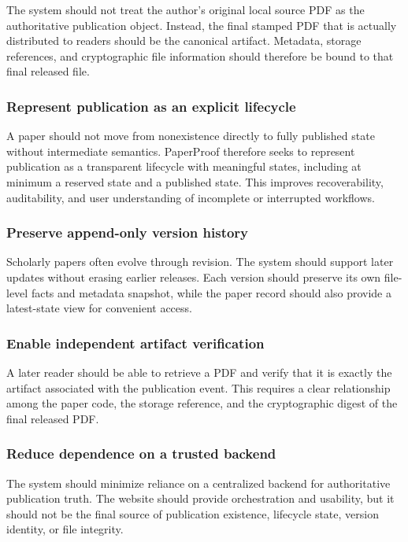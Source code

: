 \documentclass[journal]{IEEEtran}
\begin{document}
The system should not treat the author's original local source PDF as the authoritative publication object. Instead, the final stamped PDF that is actually distributed to readers should be the canonical artifact. Metadata, storage references, and cryptographic file information should therefore be bound to that final released file.

\subsubsection{Represent publication as an explicit lifecycle}

A paper should not move from nonexistence directly to fully published state without intermediate semantics. PaperProof therefore seeks to represent publication as a transparent lifecycle with meaningful states, including at minimum a reserved state and a published state. This improves recoverability, auditability, and user understanding of incomplete or interrupted workflows.

\subsubsection{Preserve append-only version history}

Scholarly papers often evolve through revision. The system should support later updates without erasing earlier releases. Each version should preserve its own file-level facts and metadata snapshot, while the paper record should also provide a latest-state view for convenient access.

\subsubsection{Enable independent artifact verification}

A later reader should be able to retrieve a PDF and verify that it is exactly the artifact associated with the publication event. This requires a clear relationship among the paper code, the storage reference, and the cryptographic digest of the final released PDF.

\subsubsection{Reduce dependence on a trusted backend}

The system should minimize reliance on a centralized backend for authoritative publication truth. The website should provide orchestration and usability, but it should not be the final source of publication existence, lifecycle state, version identity, or file integrity.
\end{document}
